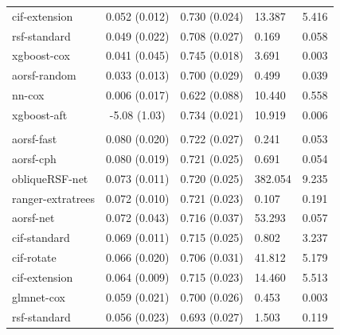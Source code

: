 \documentclass[twoside,11pt]{article}\usepackage[]{graphicx}\usepackage[]{xcolor}
\newenvironment{knitrout}{}{} %
\begin{document}
\begin{knitrout}
\begin{longtable}[t]{lcclc}
\hspace{1em}cif-extension & 0.052 (0.012) & 0.730 (0.024) & 13.387 & 5.416\\
\hspace{1em}rsf-standard & 0.049 (0.022) & 0.708 (0.027) & 0.169 & 0.058\\
\hspace{1em}xgboost-cox & 0.041 (0.045) & 0.745 (0.018) & 3.691 & 0.003\\
\hspace{1em}aorsf-random & 0.033 (0.013) & 0.700 (0.029) & 0.499 & 0.039\\
\hspace{1em}nn-cox & 0.006 (0.017) & 0.622 (0.088) & 10.440 & 0.558\\
\hspace{1em}xgboost-aft & -5.08 (1.03) & 0.734 (0.021) & 10.919 & 0.006\\
\addlinespace[0.3em]
\hline
\multicolumn{5}{l}{\textit{\textbf{GUIDE-IT; HF hospitalization, n = 894, p = 59}}}\\
\hline
\hspace{1em}aorsf-fast & 0.080 (0.020) & 0.722 (0.027) & 0.241 & 0.053\\
\hspace{1em}aorsf-cph & 0.080 (0.019) & 0.721 (0.025) & 0.691 & 0.054\\
\hspace{1em}obliqueRSF-net & 0.073 (0.011) & 0.720 (0.025) & 382.054 & 9.235\\
\hspace{1em}ranger-extratrees & 0.072 (0.010) & 0.721 (0.023) & 0.107 & 0.191\\
\hspace{1em}aorsf-net & 0.072 (0.043) & 0.716 (0.037) & 53.293 & 0.057\\
\hspace{1em}cif-standard & 0.069 (0.011) & 0.715 (0.025) & 0.802 & 3.237\\
\hspace{1em}cif-rotate & 0.066 (0.020) & 0.706 (0.031) & 41.812 & 5.179\\
\hspace{1em}cif-extension & 0.064 (0.009) & 0.715 (0.023) & 14.460 & 5.513\\
\hspace{1em}glmnet-cox & 0.059 (0.021) & 0.700 (0.026) & 0.453 & 0.003\\
\hspace{1em}rsf-standard & 0.056 (0.023) & 0.693 (0.027) & 1.503 & 0.119\\

\end{longtable}
\end{knitrout}
\end{document}
